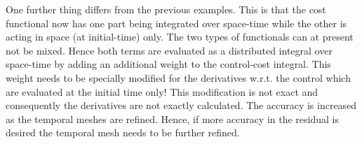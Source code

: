 One further thing differs from the previous examples. This is that the cost functional 
now has one part being integrated over space-time while the other 
is acting in space (at initial-time) only. The two types of functionals can at present 
not be mixed. Hence both terms are evaluated as a distributed integral 
over space-time by adding an additional weight to the control-cost integral.
This weight needs to be specially modified for the derivatives w.r.t. the control
which are evaluated at the initial time only!
This modification is not exact and consequently the derivatives are not exactly calculated. 
The accuracy is increased as the temporal meshes are refined. Hence, if more accuracy 
in the residual is desired the temporal mesh needs to be further refined. 